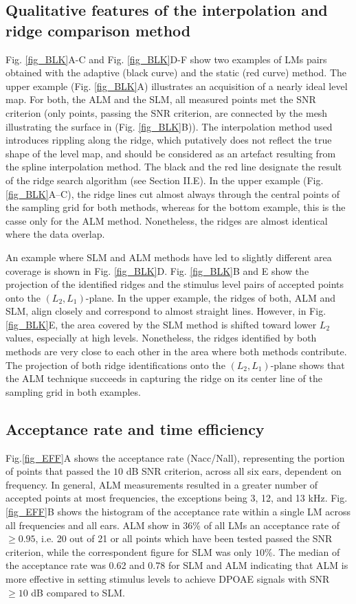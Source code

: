 \documentclass[journal,twoside,web]{ieeecolor2}
\begin{document}
\subsection{Qualitative features of the interpolation and ridge comparison method}
Fig. \ref{fig_BLK}A-C and Fig. \ref{fig_BLK}D-F show two examples of LMs pairs obtained with the adaptive (black curve) and the static (red curve) method.
The upper example (Fig. \ref{fig_BLK}A) illustrates an acquisition of a nearly ideal level map.
For both, the ALM and the SLM, all measured points met the SNR criterion (only points, passing the SNR criterion, are connected by the mesh illustrating the surface in (Fig. \ref{fig_BLK}B)).
The interpolation method used introduces rippling along the ridge, which putatively does not reflect the true shape of the level map, and should be considered as an artefact resulting from the spline interpolation method.
The black and the red line designate the result of the ridge search algorithm (see Section II.E).
In the upper example (Fig. \ref{fig_BLK}A–C), the ridge lines cut almost always through the central points of the sampling grid for both methods, whereas for the bottom example, this is the casse only for the ALM method. Nonetheless, the ridges are almost identical where the data overlap.


An example where SLM and ALM methods have led to slightly different area coverage is shown in Fig. \ref{fig_BLK}D.
Fig. \ref{fig_BLK}B and E show the projection of the identified ridges and the stimulus level pairs of accepted points onto the $(L_2, L_1)$-plane.
In the upper example, the ridges of both, ALM and SLM, align closely and correspond to almost straight lines.
However, in Fig. \ref{fig_BLK}E,  the area covered by the SLM method is shifted toward lower $L_2$ values, especially at high levels. Nonetheless, the ridges identified by both methods are very close to each other in the area where both methods contribute.
The projection of both ridge identifications onto the $(L_2, L_1)$-plane shows that the ALM technique succeeds in capturing the ridge on its center line of the sampling grid in both examples.

\subsection{Acceptance rate and time efficiency}
Fig.\ref{fig_EFF}A shows the acceptance rate (Nacc/Nall), representing the portion of points that passed the $10$ dB SNR criterion, across all six ears, dependent on frequency.
In general, ALM measurements resulted in a greater number of accepted points at most frequencies, the exceptions being 3, 12, and 13 kHz.
Fig. \ref{fig_EFF}B shows the histogram of the acceptance rate within a single LM across all frequencies and all ears.
ALM show in $36\%$ of all LMs an acceptance rate of $\ge 0.95$, i.e. 20 out of 21 or all points which have been tested passed the SNR criterion, while the correspondent figure for SLM was only $10\%$.
The median of the acceptance rate was 0.62 and 0.78 for SLM and ALM indicating that ALM is more effective in setting stimulus levels to achieve DPOAE signals with SNR $\ge10$ dB compared to SLM.
\end{document}
